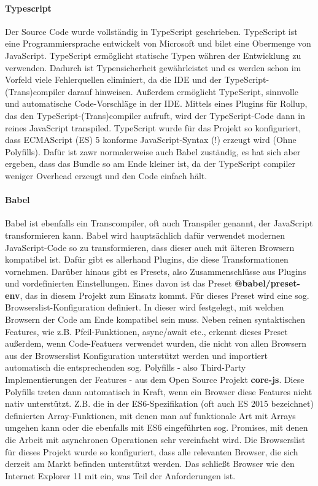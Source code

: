 
\paragraph{Typescript} Der Source Code wurde vollständig in TypeScript geschrieben. TypeScript ist eine Programmiersprache entwickelt von Microsoft und bilet eine Obermenge von JavaScript. TypeScript ermöglicht statische Typen währen der Entwicklung zu verwenden. Dadurch ist Typensicherheit gewährleistet und es werden schon im Vorfeld viele Fehlerquellen eliminiert, da die IDE und der TypeScript-(Trans)compiler darauf hinweisen. Außerdem ermöglicht TypeScript, sinnvolle und automatische Code-Vorschläge in der IDE. 
Mittels eines Plugins für Rollup, das den TypeScript-(Trans)compiler aufruft, wird der TypeScript-Code dann in reines JavaScript transpiled. TypeScript wurde für das Projekt so konfiguriert, dass ECMAScript (ES) 5 konforme JavaScript-Syntax (!) erzeugt wird (Ohne Polyfills). Dafür ist zawr normalerweise auch Babel zuständig, es hat sich aber ergeben, dass das Bundle so am Ende kleiner ist, da der TypeScript compiler weniger Overhead erzeugt und den Code einfach hält.

\paragraph{Babel} Babel ist ebenfalls ein Transcompiler, oft auch Transpiler genannt, der JavaScript transformieren kann. Babel wird hauptsächlich dafür verwendet modernen JavaScript-Code so zu transformieren, dass dieser auch mit älteren Browsern kompatibel ist. Dafür gibt es allerhand Plugins, die diese Transformationen vornehmen. Darüber hinaus gibt es Presets, also Zusammenschlüsse aus Plugins und vordefinierten Einstellungen. Eines davon ist das Preset \textbf{@babel/preset-env}, das in diesem Projekt zum Einsatz kommt. Für dieses Preset wird eine sog. Browserslist-Konfiguration definiert. In dieser wird festgelegt, mit welchen Browsern der Code am Ende kompatibel sein muss. Neben reinen syntaktischen Features, wie z.B. Pfeil-Funktionen, async/await etc., erkennt dieses Preset außerdem, wenn Code-Featuers verwendet wurden, die nicht von allen Browsern aus der Browserslist Konfiguration unterstützt werden und importiert automatisch die entsprechenden sog. Polyfills - also Third-Party Implementierungen der Features - aus dem Open Source Projekt \textbf{core-js}. Diese Polyfills treten dann automatisch in Kraft, wenn ein Browser diese Features nicht nativ unterstützt. Z.B. die in der ES6-Spezifikation (oft auch ES 2015 bezeichnet) definierten Array-Funktionen, mit denen man auf funktionale Art mit Arrays umgehen kann oder die ebenfalls mit ES6 eingeführten sog. Promises, mit denen die Arbeit mit asynchronen Operationen sehr vereinfacht wird. Die Browserslist für dieses Projekt wurde so konfiguriert, dass alle relevanten Browser, die sich derzeit am Markt befinden unterstützt werden. Das schließt Browser wie den Internet Explorer 11  mit ein, was Teil der Anforderungen ist. 


